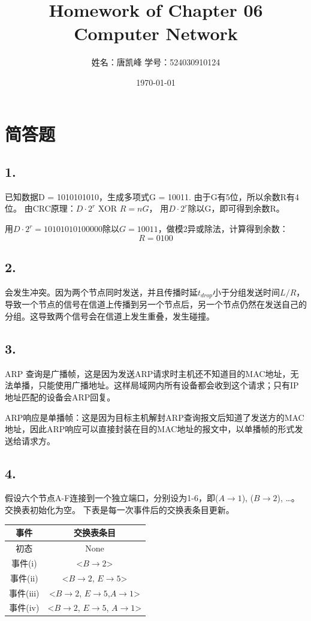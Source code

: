 \documentclass[11pt]{article}
\title{\textbf{Homework of Chapter 06 \\ \small Computer Network}}
\author{姓名：唐凯峰 \qquad 学号：524030910124}
\date{\today}
\begin{document}
\maketitle 
\section*{简答题}
\subsection*{1. } 
已知数据D = 1010101010，生成多项式G = 10011. 由于G有5位，所以余数R有4位。 
由CRC原理：$D \cdot 2^r $ XOR $R = nG$，
用$D \cdot 2^r$除以G，即可得到余数R。

用$D \cdot 2^r = 10101010100000$除以$G = 10011$，做模2异或除法，计算得到余数：
\[R = 0100\]

\subsection*{2. }
会发生冲突。因为两个节点同时发送，并且传播时延$t_{drop}$小于分组发送时间$L/R$，
导致一个节点的信号在信道上传播到另一个节点后，另一个节点仍然在发送自己的分组。这导致两个信号会在信道上发生重叠，发生碰撞。

\subsection*{3. }
ARP 查询是广播帧，这是因为发送ARP请求时主机还不知道目的MAC地址，无法单播，只能使用广播地址。这样局域网内所有设备都会收到这个请求；只有IP地址匹配的设备会ARP回复。

ARP响应是单播帧：这是因为目标主机解封ARP查询报文后知道了发送方的MAC地址，因此ARP响应可以直接封装在目的MAC地址的报文中，以单播帧的形式发送给请求方。

\subsection*{4. }
假设六个节点A-F连接到一个独立端口，分别设为1-6，即($A \to 1$), ($B \to 2$), \dots。交换表初始化为空。
下表是每一次事件后的交换表条目更新。 

\begin{table}[H] %
  \centering %
  \begin{tabular}{cc}
    \toprule %
    事件 & 交换表条目 \\
    \midrule %
    初态 & None \\
    事件(i) & <$B \to 2$> \\
    事件(ii) & <$B \to 2$, $E \to 5$>  \\
    事件(iii) & <$B \to 2$, $E \to 5$,$A \to 1$> \\
    事件(iv) & <$B \to 2$, $E \to 5$, $A \to 1$> \\
    \bottomrule %
  \end{tabular}
\end{table}
\end{document}
